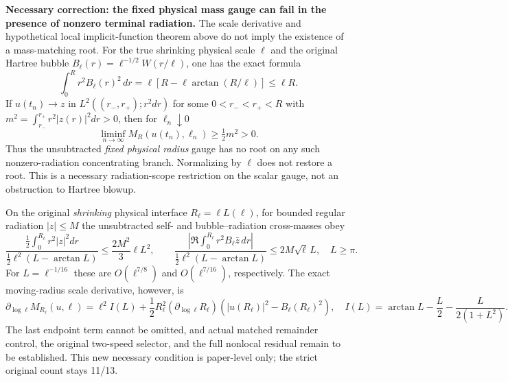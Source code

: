 \documentclass[11pt]{amsart}
\begin{document}
\medskip
\noindent\textbf{Necessary correction: the fixed physical mass gauge can
fail in the presence of nonzero terminal radiation.}
The scale derivative and hypothetical local implicit-function theorem
above do not imply the existence of a mass-matching root.  For the true
shrinking physical scale $\ell$ and the original Hartree bubble
$B_\ell(r)=\ell^{-1/2}W(r/\ell)$, one has the exact formula
\[
 \int_0^R r^2B_\ell(r)^2\,dr
 =\ell[R-\ell\arctan(R/\ell)]\le \ell R.
\]
If $u(t_n)\to z$ in $L^2((r_-,r_+);r^2dr)$ for some
$0<r_-<r_+<R$ with
$m^2=\int_{r_-}^{r_+}r^2|z(r)|^2dr>0$, then for $\ell_n\downarrow0$
\[
 \boxed{\ 
 \liminf_{n\to\infty}M_R(u(t_n),\ell_n)
 \ge\tfrac12m^2>0.
 \ }
\]
Thus the unsubtracted \emph{fixed physical radius} gauge has no root
on any such nonzero-radiation concentrating branch.  Normalizing by
$\ell$ does not restore a root.  This is a necessary radiation-scope
restriction on the scalar gauge, not an obstruction to Hartree blowup.

On the original \emph{shrinking} physical interface
$R_\ell=\ell L(\ell)$, for bounded regular radiation $|z|\le M$ the
unsubtracted self- and bubble--radiation cross-masses obey
\[
 \frac{\frac12\int_0^{R_\ell}r^2|z|^2dr}
      {\frac12\ell^2(L-\arctan L)}
 \le\frac{2M^2}{3}\ell L^2,\qquad
 \frac{\left|\Re\int_0^{R_\ell}r^2B_\ell\bar z\,dr\right|}
      {\frac12\ell^2(L-\arctan L)}
 \le 2M\sqrt\ell\,L,\quad L\ge\pi .
\]
For $L=\ell^{-1/16}$ these are $O(\ell^{7/8})$ and
$O(\ell^{7/16})$, respectively.  The exact moving-radius scale
derivative, however, is
\[
 \partial_{\log\ell}M_{R_\ell}(u,\ell)
 =\ell^2 I(L)
  +\frac12R_\ell^2
    (\partial_{\log\ell}R_\ell)
    (|u(R_\ell)|^2-B_\ell(R_\ell)^2),
\quad
 I(L)=\arctan L-\frac L2-\frac{L}{2(1+L^2)}.
\]
The last endpoint term cannot be omitted, and actual matched
remainder control, the original two-speed selector, and the full
nonlocal residual remain to be established.  This new necessary
condition is paper-level only; the strict original count stays 11/13.
\end{document}
